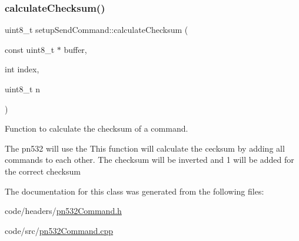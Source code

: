 \subsubsection{\texorpdfstring{calculate\+Checksum()}{calculateChecksum()}}
{\footnotesize\ttfamily uint8\+\_\+t setup\+Send\+Command\+::calculate\+Checksum (\begin{DoxyParamCaption}\item[{const uint8\+\_\+t $\ast$}]{buffer,  }\item[{int}]{index,  }\item[{uint8\+\_\+t}]{n }\end{DoxyParamCaption})}



Function to calculate the checksum of a command. 

The pn532 will use the This function will calculate the cecksum by adding all commands to each other. The checksum will be inverted and 1 will be added for the correct checksum 

The documentation for this class was generated from the following files\+:\begin{DoxyCompactItemize}
\item 
code/headers/\hyperlink{pn532Command_8h}{pn532\+Command.\+h}\item 
code/src/\hyperlink{pn532Command_8cpp}{pn532\+Command.\+cpp}\end{DoxyCompactItemize}

